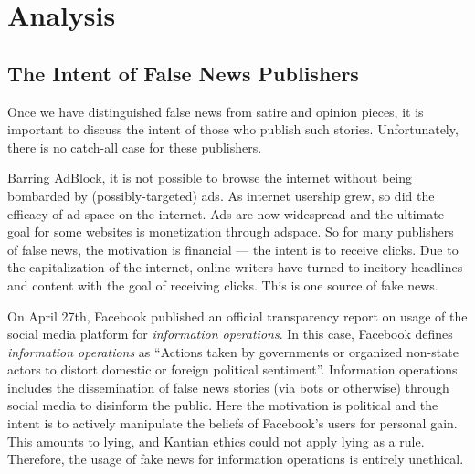 

\section{Analysis}

\newcommand{\tenetmargin}{\vspace{5mm}}







\subsection{The Intent of False News Publishers}

\par Once we have distinguished false news from satire and opinion pieces, it is important to discuss the intent of those who publish such stories. Unfortunately, there is no catch-all case for these publishers.

\par Barring AdBlock, it is not possible to browse the internet without being bombarded by (possibly-targeted) ads. As internet usership grew, so did the efficacy of ad space on the internet. Ads are now widespread and the ultimate goal for some websites is monetization through adspace. \cite{bbc_clickbait} So for many publishers of false news, the motivation is financial --- the intent is to receive clicks. Due to the capitalization of the internet, online writers have turned to incitory headlines and content with the goal of receiving clicks. This is one source of fake news.

\par On April 27th, Facebook published an official transparency report on usage of the social media platform for \emph{information operations}. In this case, Facebook defines \emph{information operations} as ``Actions taken by governments or organized non-state
actors to distort domestic or foreign political sentiment''. \cite{fb_info_ops} Information operations includes the dissemination of false news stories (via bots or otherwise) through social media to disinform the public. Here the motivation is political and the intent is to actively manipulate the beliefs of Facebook's users for personal gain. This amounts to lying, and Kantian ethics could not apply lying as a rule. \cite{kant} Therefore, the usage of fake news for information operations is entirely unethical.

